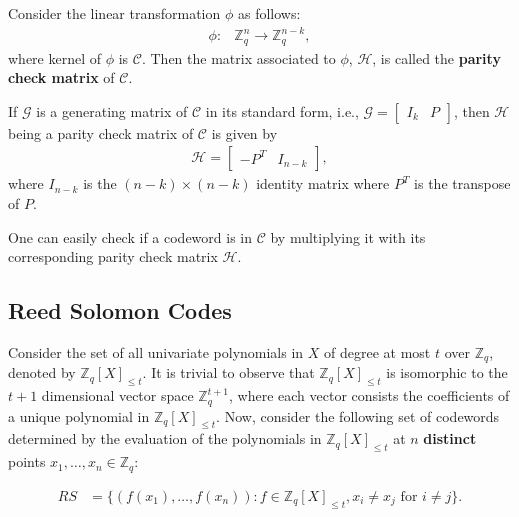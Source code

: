 \begin{definition}
  Consider the linear transformation $\phi$ as follows:
  \begin{align*}
    \phi:& \mathbb{Z}_q^n \rightarrow \mathbb{Z}_q^{n-k},
  \end{align*}
  where kernel of $\phi$ is $\mathcal{C}$. Then the matrix associated to $\phi$, $\mathcal{H}$, 
  is called the \textbf{parity check matrix} of $\mathcal{C}$.
\end{definition}

\begin{lemma}\cite{gallian2024contemporary}
  If $\mathcal{G}$ is a generating matrix of $\mathcal{C}$ in its standard form, i.e., $\mathcal{G} = \begin{bmatrix}
    I_k & P
  \end{bmatrix}$, then $\mathcal{H}$ being a parity check matrix of $\mathcal{C}$ is given by
  \begin{align*}
    \mathcal{H} = \begin{bmatrix}
      -P^T & I_{n-k}
    \end{bmatrix},
  \end{align*}
  where $I_{n-k}$ is the $(n-k)\times (n-k)$ identity matrix where $P^T$ is the transpose of $P$.
\end{lemma}

One can easily check if a codeword is in $\mathcal{C}$ by multiplying it with its corresponding parity 
check matrix $\mathcal{H}$.

\subsection{Reed Solomon Codes}
\label{subsec:reed-solomon}
Consider the set of all univariate polynomials in $X$ of degree at most $t$ over $\mathbb{Z}_q$, denoted by 
$\mathbb{Z}_q[X]_{\leq t}$. It is trivial to observe that $\mathbb{Z}_q[X]_{\leq t}$ is isomorphic to 
the $t+1$ dimensional vector space $\mathbb{Z}_q^{t+1}$, where each vector consists the coefficients of 
a unique polynomial in $\mathbb{Z}_q[X]_{\leq t}$. Now, consider the following set of codewords 
determined by the evaluation of the polynomials in $\mathbb{Z}_q[X]_{\leq t}$ at $n$ \textbf{distinct} 
points $x_1,\dots,x_n\in \mathbb{Z}_q$:

\begin{align}\label{eq:reed-solomon code}
  RS &= \{(f(x_1),\dots,f(x_n)) : f\in \mathbb{Z}_q[X]_{\leq t}, x_i\neq x_j \text{ for }i\neq j\}.
\end{align}  

